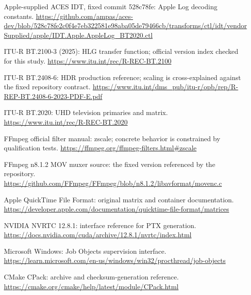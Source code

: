 \documentclass[11pt,a4paper,openany]{book}
\begin{document}
\par [11] Apple-supplied ACES IDT, fixed commit 528c78fe: Apple Log decoding constants. \url{https://github.com/ampas/aces-dev/blob/528c78fe2c0f4e7eb322581e98aba05de79466cb/transforms/ctl/idt/vendorSupplied/apple/IDT.Apple.AppleLog_BT2020.ctl}\par
\par [12] ITU-R BT.2100-3 (2025): HLG transfer function; official version index checked for this study. \url{https://www.itu.int/rec/R-REC-BT.2100}\par
\par [13] ITU-R BT.2408-6: HDR production reference; scaling is cross-explained against the fixed repository contract. \url{https://www.itu.int/dms_pub/itu-r/opb/rep/R-REP-BT.2408-6-2023-PDF-E.pdf}\par
\par [14] ITU-R BT.2020: UHD television primaries and matrix. \url{https://www.itu.int/rec/R-REC-BT.2020}\par
\par [15] FFmpeg official filter manual: zscale; concrete behavior is constrained by qualification tests. \url{https://ffmpeg.org/ffmpeg-filters.html#zscale}\par
\par [16] FFmpeg n8.1.2 MOV muxer source: the fixed version referenced by the repository. \url{https://github.com/FFmpeg/FFmpeg/blob/n8.1.2/libavformat/movenc.c}\par
\par [17] Apple QuickTime File Format: original matrix and container documentation. \url{https://developer.apple.com/documentation/quicktime-file-format/matrices}\par
\par [18] NVIDIA NVRTC 12.8.1: interface reference for PTX generation. \url{https://docs.nvidia.com/cuda/archive/12.8.1/nvrtc/index.html}\par
\par [19] Microsoft Windows: Job Objects supervision interface. \url{https://learn.microsoft.com/en-us/windows/win32/procthread/job-objects}\par
\par [20] CMake CPack: archive and checksum-generation reference. \url{https://cmake.org/cmake/help/latest/module/CPack.html}\par
\end{document}

